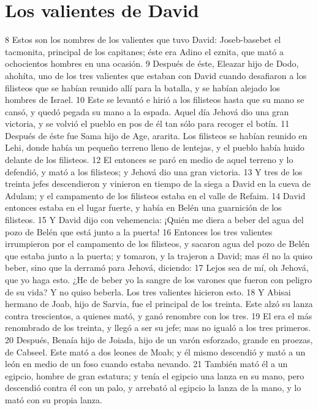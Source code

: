 \section*{Los valientes de David}

8 Estos son los nombres de los valientes que tuvo David: Joseb-basebet el tacmonita, principal de los capitanes; éste era Adino el eznita, que mató a ochocientos hombres en una ocasión.
9 Después de éste, Eleazar hijo de Dodo, ahohíta, uno de los tres valientes que estaban con David cuando desafiaron a los filisteos que se habían reunido allí para la batalla, y se habían alejado los hombres de Israel.
10 Este se levantó e hirió a los filisteos hasta que su mano se cansó, y quedó pegada su mano a la espada. Aquel día Jehová dio una gran victoria, y se volvió el pueblo en pos de él tan sólo para recoger el botín.
11 Después de éste fue Sama hijo de Age, ararita. Los filisteos se habían reunido en Lehi, donde había un pequeño terreno lleno de lentejas, y el pueblo había huido delante de los filisteos.
12 El entonces se paró en medio de aquel terreno y lo defendió, y mató a los filisteos; y Jehová dio una gran victoria.
13 Y tres de los treinta jefes descendieron y vinieron en tiempo de la siega a David en la cueva de Adulam; y el campamento de los filisteos estaba en el valle de Refaim.
14 David entonces estaba en el lugar fuerte, y había en Belén una guarnición de los filisteos.
15 Y David dijo con vehemencia: ¡Quién me diera a beber del agua del pozo de Belén que está junto a la puerta!
16 Entonces los tres valientes irrumpieron por el campamento de los filisteos, y sacaron agua del pozo de Belén que estaba junto a la puerta; y tomaron, y la trajeron a David; mas él no la quiso beber, sino que la derramó para Jehová, diciendo:
17 Lejos sea de mí, oh Jehová, que yo haga esto. ¿He de beber yo la sangre de los varones que fueron con peligro de su vida? Y no quiso beberla. Los tres valientes hicieron esto.
18 Y Abisai hermano de Joab, hijo de Sarvia, fue el principal de los treinta. Este alzó su lanza contra trescientos, a quienes mató, y ganó renombre con los tres.
19 El era el más renombrado de los treinta, y llegó a ser su jefe; mas no igualó a los tres primeros.
20 Después, Benaía hijo de Joiada, hijo de un varón esforzado, grande en proezas, de Cabseel. Este mató a dos leones de Moab; y él mismo descendió y mató a un león en medio de un foso cuando estaba nevando.
21 También mató él a un egipcio, hombre de gran estatura; y tenía el egipcio una lanza en su mano, pero descendió contra él con un palo, y arrebató al egipcio la lanza de la mano, y lo mató con su propia lanza.
